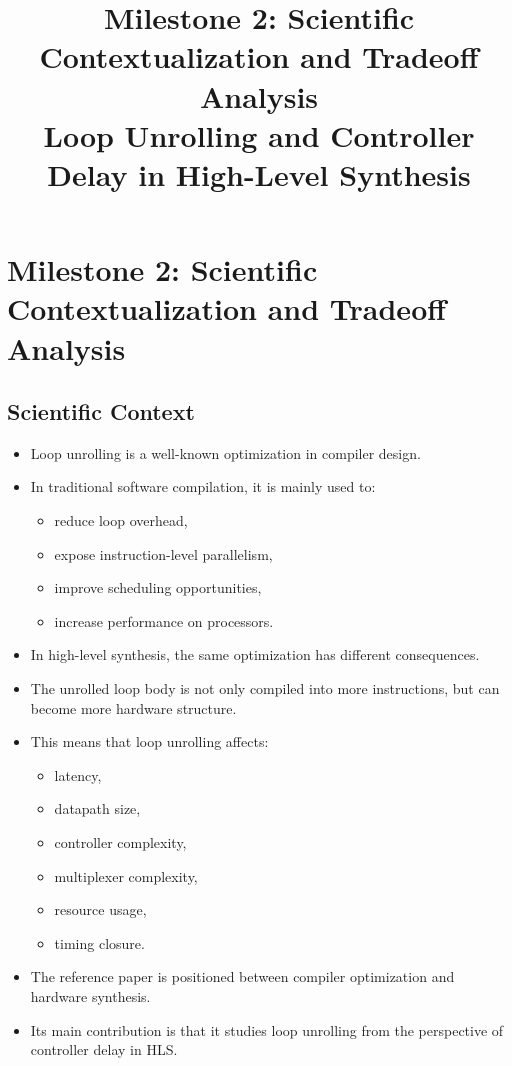 \documentclass[conference]{IEEEtran}
\begin{document}
\title{Milestone 2: Scientific Contextualization and Tradeoff Analysis\\
Loop Unrolling and Controller Delay in High-Level Synthesis}

\author{
}

\maketitle

\section{Milestone 2: Scientific Contextualization and Tradeoff Analysis}

\subsection{Scientific Context}

\begin{itemize}
    \item Loop unrolling is a well-known optimization in compiler design.
    \item In traditional software compilation, it is mainly used to:
    \begin{itemize}
        \item reduce loop overhead,
        \item expose instruction-level parallelism,
        \item improve scheduling opportunities,
        \item increase performance on processors.
    \end{itemize}

    \item In high-level synthesis, the same optimization has different consequences.
    \item The unrolled loop body is not only compiled into more instructions, but can become more hardware structure.
    \item This means that loop unrolling affects:
    \begin{itemize}
        \item latency,
        \item datapath size,
        \item controller complexity,
        \item multiplexer complexity,
        \item resource usage,
        \item timing closure.
    \end{itemize}

    \item The reference paper is positioned between compiler optimization and hardware synthesis.
    \item Its main contribution is that it studies loop unrolling from the perspective of controller delay in HLS.
\end{itemize}
\end{document}
